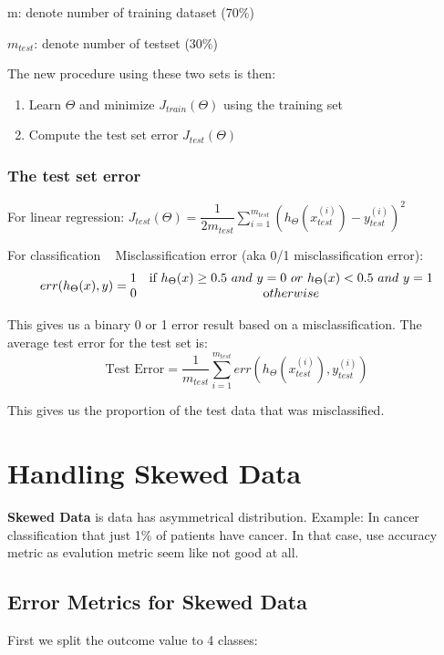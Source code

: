 \documentclass{article}
\begin{document}
m: denote number of training dataset (70\%)

$m_{test}$: denote number of testset (30\%)

\noindent The new procedure using these two sets is then:

\begin{enumerate}
	\item Learn $\Theta$ and minimize $J_{train}(\Theta)$ using the training set
	\item Compute the test set error $J_{test}(\Theta)$
\end{enumerate}

\subsubsection{The test set error}
For linear regression: $J_{test}(\Theta) = \dfrac{1}{2m_{test}} \sum_{i=1}^{m_{test}}(h_\Theta(x^{(i)}_{test}) - y^{(i)}_{test})^2$

For classification ~ Misclassification error (aka 0/1 misclassification error):
$$err(h_\Theta(x),y) = \begin{matrix} 1 & \mbox{if } h_\Theta(x) \geq 0.5\ and\ y = 0\ or\ h_\Theta(x) < 0.5\ and\ y = 1\\ 0 & \mbox otherwise \end{matrix}$$

This gives us a binary 0 or 1 error result based on a misclassification. The average test error for the test set is:
$$\text{Test Error} = \dfrac{1}{m_{test}} \sum^{m_{test}}_{i=1} err(h_\Theta(x^{(i)}_{test}), y^{(i)}_{test})$$

This gives us the proportion of the test data that was misclassified.

\section{Handling Skewed Data}
\textbf{Skewed Data} is data has asymmetrical distribution. Example: In cancer classification that just 1\% of patients have cancer.
In that case, use accuracy metric as evalution metric seem like not good at all. 
\subsection{Error Metrics for Skewed Data}
First we split the outcome value to 4 classes:
\end{document}
